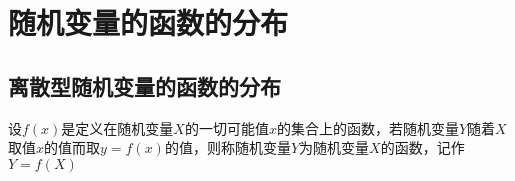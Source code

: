 
\section{随机变量的函数的分布}
\subsection{离散型随机变量的函数的分布}
设$f(x)$是定义在随机变量$X$的一切可能值$x$的集合上的函数，若随机变量$Y$随着$X$取值$x$的值而取$y=f(x)$的值，则称随机变量$Y$为随机变量$X$的函数，记作$Y=f(X)$

